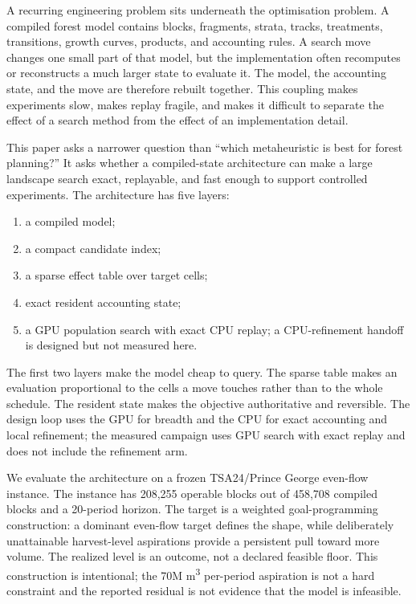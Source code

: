 \documentclass[11pt]{article}
\providecommand{\tightlist}{\setlength{\itemsep}{0pt}\setlength{\parskip}{0pt}}
\begin{document}
A recurring engineering problem sits underneath the optimisation problem. A compiled forest model contains blocks, fragments, strata, tracks, treatments, transitions, growth curves, products, and accounting rules. A search move changes one small part of that model, but the implementation often recomputes or reconstructs a much larger state to evaluate it. The model, the accounting state, and the move are therefore rebuilt together. This coupling makes experiments slow, makes replay fragile, and makes it difficult to separate the effect of a search method from the effect of an implementation detail.

This paper asks a narrower question than ``which metaheuristic is best for forest planning?'' It asks whether a compiled-state architecture can make a large landscape search exact, replayable, and fast enough to support controlled experiments. The architecture has five layers:

\begin{enumerate}
\def\labelenumi{\arabic{enumi}.}
\tightlist
\item
  a compiled model;
\item
  a compact candidate index;
\item
  a sparse effect table over target cells;
\item
  exact resident accounting state;
\item
  a GPU population search with exact CPU replay; a CPU-refinement handoff is designed but not measured here.
\end{enumerate}

The first two layers make the model cheap to query. The sparse table makes an evaluation proportional to the cells a move touches rather than to the whole schedule. The resident state makes the objective authoritative and reversible. The design loop uses the GPU for breadth and the CPU for exact accounting and local refinement; the measured campaign uses GPU search with exact replay and does not include the refinement arm.

We evaluate the architecture on a frozen TSA24/Prince George even-flow instance. The instance has 208,255 operable blocks out of 458,708 compiled blocks and a 20-period horizon. The target is a weighted goal-programming construction: a dominant even-flow target defines the shape, while deliberately unattainable harvest-level aspirations provide a persistent pull toward more volume. The realized level is an outcome, not a declared feasible floor. This construction is intentional; the 70M m\textsuperscript{3} per-period aspiration is not a hard constraint and the reported residual is not evidence that the model is infeasible.
\end{document}
